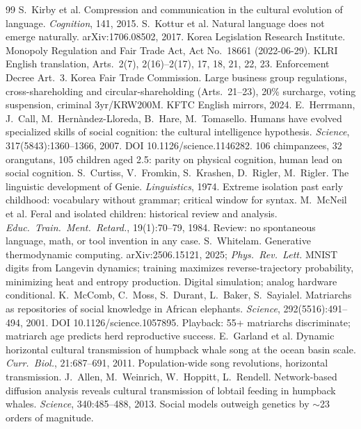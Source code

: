 \documentclass[11pt,openany]{book}
\begin{document}
\begin{thebibliography}{99}
 S.\ Kirby et al. Compression and communication in the cultural evolution of language. \textit{Cognition}, 141, 2015.
 S.\ Kottur et al. Natural language does not emerge naturally. arXiv:1706.08502, 2017.
 Korea Legislation Research Institute. Monopoly Regulation and Fair Trade Act, Act No.\ 18661 (2022-06-29). KLRI English translation, Arts.\ 2(7), 2(16)--2(17), 17, 18, 21, 22, 23. Enforcement Decree Art.\ 3.
 Korea Fair Trade Commission. Large business group regulations, cross-shareholding and circular-shareholding (Arts.\ 21--23), 20\% surcharge, voting suspension, criminal 3yr/KRW200M. KFTC English mirrors, 2024.
 E.\ Herrmann, J.\ Call, M.\ Hern\`andez-Lloreda, B.\ Hare, M.\ Tomasello. Humans have evolved specialized skills of social cognition: the cultural intelligence hypothesis. \textit{Science}, 317(5843):1360--1366, 2007. DOI 10.1126/science.1146282. 106 chimpanzees, 32 orangutans, 105 children aged 2.5: parity on physical cognition, human lead on social cognition.
 S.\ Curtiss, V.\ Fromkin, S.\ Krashen, D.\ Rigler, M.\ Rigler. The linguistic development of Genie. \textit{Linguistics}, 1974. Extreme isolation past early childhood: vocabulary without grammar; critical window for syntax.
 M.\ McNeil et al. Feral and isolated children: historical review and analysis. \textit{Educ.\ Train.\ Ment.\ Retard.}, 19(1):70--79, 1984. Review: no spontaneous language, math, or tool invention in any case.
 S.\ Whitelam. Generative thermodynamic computing. arXiv:2506.15121, 2025; \textit{Phys.\ Rev.\ Lett.} MNIST digits from Langevin dynamics; training maximizes reverse-trajectory probability, minimizing heat and entropy production. Digital simulation; analog hardware conditional.
 K.\ McComb, C.\ Moss, S.\ Durant, L.\ Baker, S.\ Sayialel. Matriarchs as repositories of social knowledge in African elephants. \textit{Science}, 292(5516):491--494, 2001. DOI 10.1126/science.1057895. Playback: 55+ matriarchs discriminate; matriarch age predicts herd reproductive success.
 E.\ Garland et al. Dynamic horizontal cultural transmission of humpback whale song at the ocean basin scale. \textit{Curr.\ Biol.}, 21:687--691, 2011. Population-wide song revolutions, horizontal transmission.
 J.\ Allen, M.\ Weinrich, W.\ Hoppitt, L.\ Rendell. Network-based diffusion analysis reveals cultural transmission of lobtail feeding in humpback whales. \textit{Science}, 340:485--488, 2013. Social models outweigh genetics by $\sim$23 orders of magnitude.

\end{thebibliography}
\end{document}
